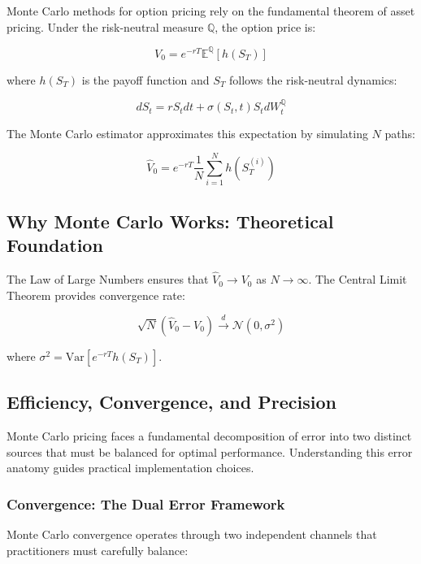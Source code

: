 \documentclass[11pt,a4paper]{article}
\begin{document}
Monte Carlo methods for option pricing rely on the fundamental theorem of asset pricing. Under the risk-neutral measure $\mathbb{Q}$, the option price is:

\begin{equation}
V_0 = e^{-rT} \mathbb{E}^{\mathbb{Q}}[h(S_T)]
\end{equation}

where $h(S_T)$ is the payoff function and $S_T$ follows the risk-neutral dynamics:

\begin{equation}
dS_t = rS_t dt + \sigma(S_t,t) S_t dW_t^{\mathbb{Q}}
\end{equation}

The Monte Carlo estimator approximates this expectation by simulating $N$ paths:

\begin{equation}
\hat{V}_0 = e^{-rT} \frac{1}{N} \sum_{i=1}^N h(S_T^{(i)})
\end{equation}

\subsection{Why Monte Carlo Works: Theoretical Foundation}

The Law of Large Numbers ensures that $\hat{V}_0 \to V_0$ as $N \to \infty$. The Central Limit Theorem provides convergence rate:

\begin{equation}
\sqrt{N}(\hat{V}_0 - V_0) \xrightarrow{d} \mathcal{N}(0, \sigma^2)
\end{equation}

where $\sigma^2 = \text{Var}[e^{-rT}h(S_T)]$.

\subsection{Efficiency, Convergence, and Precision}

Monte Carlo pricing faces a fundamental decomposition of error into two distinct sources that must be balanced for optimal performance. Understanding this error anatomy guides practical implementation choices.

\subsubsection{Convergence: The Dual Error Framework}

Monte Carlo convergence operates through two independent channels that practitioners must carefully balance:
\end{document}
